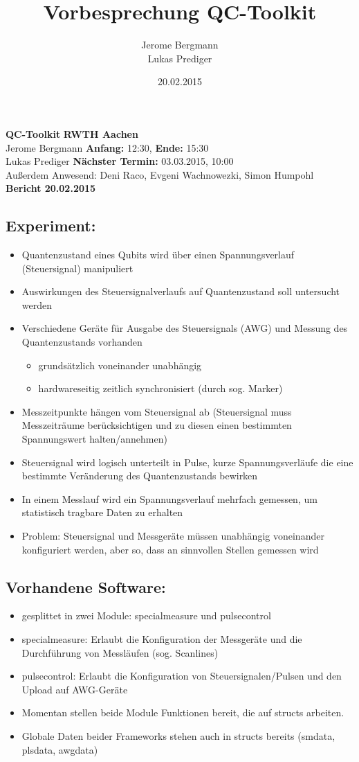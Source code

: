 \documentclass[DIN, pagenumber=false, fontsize=11pt]{scrartcl}
\title{Vorbesprechung QC-Toolkit}
\date{20.02.2015}
\author{Jerome Bergmann \\ Lukas Prediger}
\newcommand{\mytitle}[1]{{\noindent\Large\textbf{#1}}}
\begin{document}
\noindent\textbf{QC-Toolkit} \hfill \textbf{RWTH Aachen}\\
Jerome Bergmann \hfill \textbf{Anfang:} 12:30, \textbf{Ende:} 15:30 \\
Lukas Prediger  \hfill \textbf{Nächster Termin:} 03.03.2015, 10:00\\
Außerdem Anwesend: Deni Raco, Evgeni Wachnowezki, Simon Humpohl\\

\mytitle{Bericht \thesection \hfill 20.02.2015}

\subsection{ Experiment: }
\begin{itemize}[noitemsep]
	\item Quantenzustand eines Qubits wird über einen Spannungsverlauf (Steuersignal) manipuliert
	\item Auswirkungen des Steuersignalverlaufs auf Quantenzustand soll untersucht werden
	\item Verschiedene Geräte für Ausgabe des Steuersignals (AWG) und Messung des Quantenzustands vorhanden
	\begin{itemize}[noitemsep]
		\item grundsätzlich voneinander unabhängig
		\item hardwareseitig zeitlich synchronisiert (durch sog. Marker)
	\end{itemize}
	\item Messzeitpunkte hängen vom Steuersignal ab (Steuersignal muss Messzeiträume berücksichtigen und zu diesen einen bestimmten Spannungswert halten/annehmen)
	\item Steuersignal wird logisch unterteilt in Pulse, kurze Spannungsverläufe die eine bestimmte Veränderung des Quantenzustands bewirken
	\item In einem Messlauf wird ein Spannungsverlauf mehrfach gemessen, um statistisch tragbare Daten zu erhalten
	\item Problem: Steuersignal und Messgeräte müssen unabhängig voneinander konfiguriert werden, aber so, dass an sinnvollen Stellen gemessen wird
\end{itemize}

\subsection{ Vorhandene Software: }
\begin{itemize}[noitemsep]
	\item gesplittet in zwei Module: specialmeasure und pulsecontrol
	\item specialmeasure: Erlaubt die Konfiguration der Messgeräte und die Durchführung von Messläufen (sog. Scanlines)
	\item pulsecontrol: Erlaubt die Konfiguration von Steuersignalen/Pulsen und den Upload auf AWG-Geräte
	\item Momentan stellen beide Module Funktionen bereit, die auf structs arbeiten.
	\item Globale Daten beider Frameworks stehen auch in structs bereits (smdata, plsdata, awgdata)
\end{itemize}
\end{document}
